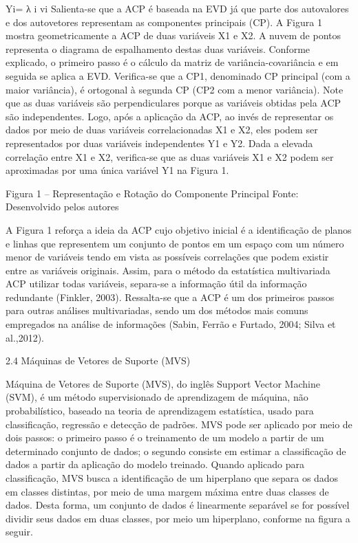 Yi= λ i vi
Salienta-se que a ACP é baseada na EVD já que parte dos autovalores e dos autovetores representam as componentes principais (CP). 
A Figura 1 mostra geometricamente a ACP de duas variáveis X1 e X2. A nuvem de pontos representa o diagrama de espalhamento destas duas variáveis. Conforme explicado, o primeiro passo é o cálculo da matriz de variância-covariância e em seguida se aplica a EVD. Verifica-se que a CP1, denominado CP principal (com a maior variância), é ortogonal à segunda CP (CP2 com a menor variância). Note que as duas variáveis são perpendiculares porque as variáveis obtidas pela ACP são independentes. Logo, após a aplicação da ACP, ao invés de representar os dados por meio de duas variáveis correlacionadas X1 e X2, eles podem ser representados por duas variáveis independentes Y1 e Y2. Dada a elevada correlação entre X1 e X2, verifica-se que as duas variáveis X1 e X2 podem ser aproximadas por uma única variável Y1 na Figura 1.

Figura 1 – Representação e Rotação do Componente Principal
Fonte: Desenvolvido pelos autores

A Figura 1 reforça a ideia da ACP cujo objetivo inicial é a identificação de planos e linhas que representem um conjunto de pontos em um espaço com um número menor de variáveis tendo em vista as possíveis correlações que podem existir entre as variáveis originais.
Assim, para o método da estatística multivariada ACP utilizar todas variáveis, separa-se a informação útil da informação redundante (Finkler, 2003). Ressalta-se que a ACP é um dos primeiros passos para outras análises multivariadas, sendo um dos métodos mais comuns empregados na análise de informações (Sabin, Ferrão e Furtado, 2004; Silva et al.,2012).

2.4 Máquinas de Vetores de Suporte (MVS)

Máquina de Vetores de Suporte (MVS), do inglês Support Vector Machine (SVM), é um método supervisionado de aprendizagem de máquina, não probabilístico, baseado na teoria de aprendizagem estatística, usado para classificação, regressão e detecção de padrões. MVS pode ser aplicado por meio de dois passos: o primeiro passo é o treinamento de um modelo a partir de um determinado conjunto de dados; o segundo consiste em estimar a classificação de dados a partir da aplicação do modelo treinado. 
Quando aplicado para classificação, MVS busca a identificação de um hiperplano que separa os dados em classes distintas, por meio de uma margem máxima entre duas classes de dados. Desta forma, um conjunto de dados é linearmente separável se for possível dividir seus dados em duas classes, por meio um hiperplano, conforme na figura a seguir. 


